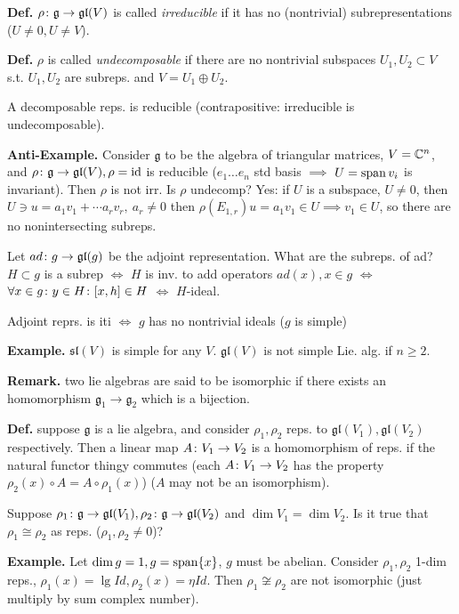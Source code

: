 \documentclass[]{../../../../tex/classes/styledArticle}
\newcommand\gl {\mathfrak{gl}}
\newcommand\g  {\mathfrak{g}}
\newcommand\Sl {\mathfrak{sl}}
\begin{document}
	\textbf{Def. }$\rho \co \g \to \gl(V)$ is called \textit{irreducible} if it has no (nontrivial) subrepresentations ($U \neq 0, U \neq V$). 
	
	\textbf{Def. }$\rho$ is called \textit{undecomposable} if there are no nontrivial subspaces $U_1, U_2 \subset V$ s.t. $U_1, U_2$ are subreps. and $V = U_1 \oplus U_2$. 
	
	A decomposable reps. is reducible (contrapositive: irreducible is undecomposable). 
	
	\textbf{Anti-Example. }Consider $\g$ to be the algebra of triangular matrices, $V = \mathbb{C}^{n}$, and $\rho \co \g \to \gl(V), \rho = \mathrm{id}$ is reducible ($e_1 \dots e_n$ std basis $\implies$ $U = \operatorname{span} v_i$ is invariant). Then $\rho$ is not irr. Is $\rho$ undecomp? Yes: if $U$ is a subspace, $U \neq 0$, then $U \ni u = a_1v_1 + \cdots a_rv_r,\  a_r \neq 0$ then $\rho(E_{1,r})u = a_1v_1 \in U \implies v_1 \in U$, so there are no nonintersecting subreps. 
	
	Let $ad \co g \to \gl(g)$ be the adjoint representation. What are the subreps. of ad? $H \subset g$ is a subrep $\iff$ $H$ is inv. to add operators $ad(x), x \in g$ $\iff$ $\forall x \in g \colon y \in H \colon [x, h] \in H$ $\iff$ $H$-ideal. 
	
	Adjoint reprs. is iti $\iff$ $g$ has no nontrivial ideals ($g$ is simple)
	
	\textbf{Example. }$\Sl(V)$ is simple for any $V$. $\gl(V)$ is not simple Lie. alg. if $n \ge 2$. 
	
	\textbf{Remark. }two lie algebras are said to be isomorphic if there exists an homomorphism $\g_1 \to \g_2$ which is a bijection. 
	
	\textbf{Def. }suppose $\g$ is a lie algebra, and consider $\rho_1, \rho_2$ reps. to $\gl(V_1),\gl(V_2)$ respectively. Then a linear map $A \colon V_1 \to V_2$ is a homomorphism of reps. if the natural functor thingy commutes (each $A \colon V_1 \to V_2$ has the property $\rho_2(x) \circ A = A \circ \rho_1(x)$) ($A$ may not be an isomorphism). 
	
	Suppose $\rho_1 \co \g \to \gl(V_1), \rho_2 \co \g \to \gl(V_2)$ and $\dim V_1 = \dim V_2$. Is it true that $\rho_1 \cong \rho_2$ as reps. ($\rho_1, \rho_2 \neq 0$)? 
	
	\textbf{Example. }Let $\dim g = 1, g = \operatorname{span} \{x\}$, $g$ must be abelian. Consider $\rho_1, \rho_2$ 1-dim reps., $\rho_1(x) = \lg Id, \rho_2(x) = \eta Id$. Then $\rho_1 \not\cong \rho_2$ are not isomorphic (just multiply by sum complex number). 
	
\end{document}
